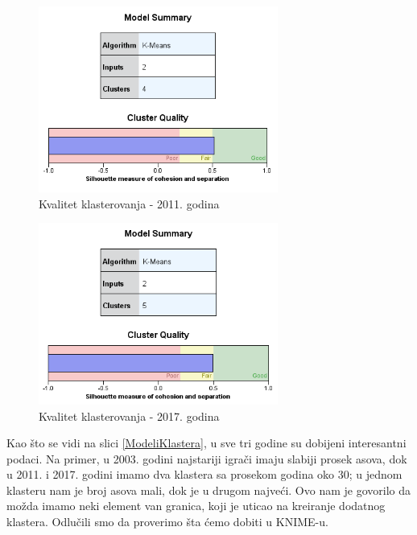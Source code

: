 \documentclass[a4paper]{article}
\begin{document}
\begin{figure}[H]
	\begin{center}
		\includegraphics[width=0.7\textwidth]{Klasterovanje/Model_KMeans2011_Silhouette.png}
	\end{center}
	\caption{Kvalitet klasterovanja - 2011. godina}
	\label{fig:SPSS_Silueta2011}
\end{figure}

\begin{figure}[H]
	\begin{center}
		\includegraphics[width=0.7\textwidth]{Klasterovanje/Model_KMeans2017_Silhouette.png}
	\end{center}
	\caption{Kvalitet klasterovanja - 2017. godina}
	\label{fig:SPSS_Silueta2017}
\end{figure}

Kao što se vidi na slici \ref{ModeliKlastera}, u sve tri godine su dobijeni interesantni podaci. Na primer, u 2003. godini najstariji igrači imaju slabiji prosek asova, dok u 2011. i 2017. godini imamo dva klastera sa prosekom godina oko 30; u jednom klasteru nam je broj asova mali, dok je u drugom najveći. Ovo nam je govorilo da možda imamo neki element van granica, koji je uticao na kreiranje dodatnog klastera. Odlučili smo da proverimo šta ćemo dobiti u KNIME-u.
\end{document}
